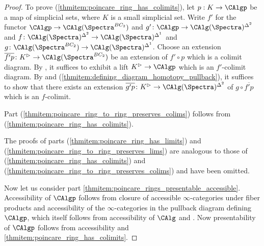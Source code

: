 \begin{proof}
    To prove (\ref{thmitem:poincare_ring_has_colimits}), let $p:K\to \CAlgp$ be a map of simplicial sets, where $K$ is a small simplicial set. 
    Write $ f' $ for the functor $\CAlgp \to \CAlg(\Spectra^{BC_2})$ and $ g'\colon \CAlgp \to  \CAlg(\Spectra)^{\Delta^2} $ and $ f \colon \CAlg(\Spectra)^{\Delta^2} \to  \CAlg(\Spectra)^{\Delta^1} $ and $ g \colon \CAlg(\Spectra^{BC_2}) \to  \CAlg(\Spectra)^{\Delta^1} $. 
    Choose an extension $ \overline{f'p} \colon K^\vartriangleright\to \CAlg(\Spectra^{BC_2}) $ be an extension of $ f'\circ p $ which is a colimit diagram. 
    By \cite[Proposition 4.3.1.5(2)]{HTT}, it suffices to exhibit a lift $ K^\vartriangleright \to \CAlgp $ which is an $ f' $-colimit diagram. 
    By \cite[Prposition 4.3.1.5(4)]{HTT} and (\ref{thmitem:defining_diagram_homotopy_pullback}), it suffices to show that there exists an extension $ \overline{g'p} \colon K^\vartriangleright \to \CAlg(\Spectra)^{\Delta^2} $ of $ g \circ \overline{f'p} $ which is an $ f $-colimit. 

    Part (\ref{thmitem:poincare_ring_to_ring_preserves_colims}) follows from (\ref{thmitem:poincare_ring_has_colimits}). 

    The proofs of parts (\ref{thmitem:poincare_ring_has_limits}) and (\ref{thmitem:poincare_ring_to_ring_preserves_lims}) are analogous to those of (\ref{thmitem:poincare_ring_has_colimits}) and (\ref{thmitem:poincare_ring_to_ring_preserves_colims}) and have been omitted.  

    Now let us consider part \ref{thmitem:poincare_rings_presentable_accessible}. 
    Accessibility of $ \CAlgp $ follows from closure of accessible $ \infty $-categories under fiber products \cite[Proposition 5.4.6.6]{HTT} and accessibility of the $ \infty $-categories in the pullback diagram defining $ \CAlgp $, which itself follows from accessibility of $ \CAlg $ and \cite[Proposition 5.4.4.3]{HTT}. 
    Now presentability of $ \CAlgp $ follows from accessibility and \ref{thmitem:poincare_ring_has_colimits}. 
\end{proof}
